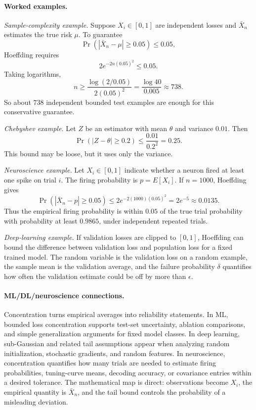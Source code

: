 \paragraph{Worked examples.}
\emph{Sample-complexity example.}
Suppose \(X_i\in[0,1]\) are independent losses and \(\bar X_n\) estimates the true risk \(\mu\). To guarantee
\[
\Pr(|\bar X_n-\mu|\geq0.05)\leq0.05,
\]
Hoeffding requires
\[
2e^{-2n(0.05)^2}\leq0.05.
\]
Taking logarithms,
\[
n\geq \frac{\log(2/0.05)}{2(0.05)^2}
=\frac{\log 40}{0.005}
\approx738.
\]
So about \(738\) independent bounded test examples are enough for this conservative guarantee.

\emph{Chebyshev example.}
Let \(Z\) be an estimator with mean \(\theta\) and variance \(0.01\). Then
\[
\Pr(|Z-\theta|\geq0.2)\leq \frac{0.01}{0.2^2}=0.25.
\]
This bound may be loose, but it uses only the variance.

\emph{Neuroscience example.}
Let \(X_i\in[0,1]\) indicate whether a neuron fired at least one spike on trial \(i\). The firing probability is \(p=E[X_i]\). If \(n=1000\), Hoeffding gives
\[
\Pr(|\bar X_n-p|\geq0.05)\leq2e^{-2(1000)(0.05)^2}
=2e^{-5}\approx0.0135.
\]
Thus the empirical firing probability is within \(0.05\) of the true trial probability with probability at least \(0.9865\), under independent repeated trials.

\emph{Deep-learning example.}
If validation losses are clipped to \([0,1]\), Hoeffding can bound the difference between validation loss and population loss for a fixed trained model. The random variable is the validation loss on a random example, the sample mean is the validation average, and the failure probability \(\delta\) quantifies how often the validation estimate could be off by more than \(\epsilon\).

\paragraph{ML/DL/neuroscience connections.}
Concentration turns empirical averages into reliability statements. In ML, bounded loss concentration supports test-set uncertainty, ablation comparisons, and simple generalization arguments for fixed model classes. In deep learning, sub-Gaussian and related tail assumptions appear when analyzing random initialization, stochastic gradients, and random features. In neuroscience, concentration quantifies how many trials are needed to estimate firing probabilities, tuning-curve means, decoding accuracy, or covariance entries within a desired tolerance. The mathematical map is direct: observations become \(X_i\), the empirical quantity is \(\bar X_n\), and the tail bound controls the probability of a misleading deviation.


